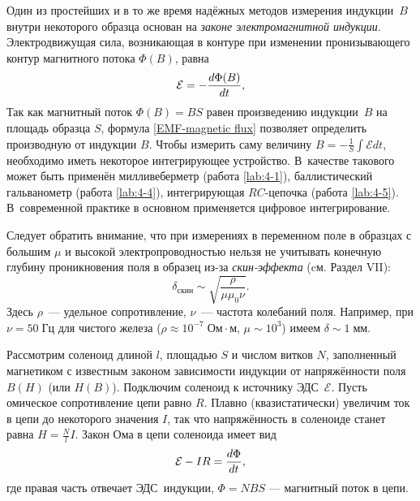 
Один из простейших и в то же время надёжных методов измерения
индукции~$B$ внутри некоторого образца основан
на \emph{законе электромагнитной индукции}.
Электродвижущая сила, возникающая в контуре при изменении
пронизывающего контур магнитного потока $\Phi(B)$, равна
\begin{equation}
	\eqmark{EMF-magnetic flux}
	\mathcal{E} = - \frac{d\Phi (B)}{dt},
\end{equation}
Так как магнитный поток $\Phi (B)=BS$ равен произведению индукции~$B$ на площадь
образца $S$, формула \eqref{EMF-magnetic flux} позволяет определить производную от
индукции $B$. Чтобы измерить саму величину $B=-\frac1{S}\int \mathcal{E} dt$,
необходимо иметь некоторое интегрирующее устройство.
В~качестве такового может быть применён милливеберметр 
(работа \ref{lab:4-1}),
баллистический гальванометр (работа \ref{lab:4-4}), интегрирующая $RC$-цепочка
(работа \ref{lab:4-5}). 
В~современной практике в основном применяется цифровое интегрирование.

\begin{lab:note}
Следует обратить внимание, что при измерениях в переменном поле
в образцах с большим $\mu$ и высокой электропроводностью
нельзя не учитывать конечную глубину
проникновения поля в образец из-за \emph{скин-эффекта} (cм. Раздел VII):
\begin{equation*}
\delta_{скин} \sim \sqrt{\frac{\rho}{\mu \mu_0 \nu}}.
\end{equation*}
Здесь $\rho$~--- удельное сопротивление, $\nu$~--- частота колебаний поля.
Например, при $\nu=50\;Гц$ для чистого железа ($\rho \approx 10^{-7}\;Ом\cdot м$,
$\mu \sim 10^3$) имеем $\delta \sim 1\;мм$.
\end{lab:note}

\label{sec:forces}


Рассмотрим соленоид длиной $l$, площадью $S$ и числом витков $N$,
заполненный магнетиком с известным законом зависимости индукции от напряжённости
поля $B(H)$ (или $H(B)$). Подключим соленоид к источнику ЭДС~$\mathcal{E}$.
Пусть омическое сопротивление цепи равно $R$.
Плавно (квазистатически) увеличим ток в цепи до некоторого значения
$I$, так что напряжённость в соленоиде станет равна
$H = \frac{N}{l} I$. Закон Ома в цепи соленоида имеет вид
\begin{equation}
    \eqmark{OhmLaw-solenoid}
\mathcal{E} - IR = \frac{d\Phi}{dt},
\end{equation}
где правая часть отвечает ЭДС~индукции, $\Phi = NBS$ --- магнитный поток в
цепи.

